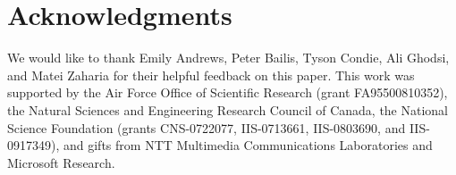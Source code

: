 \section*{Acknowledgments}
We would like to thank Emily Andrews, Peter Bailis, Tyson Condie, Ali Ghodsi,
and Matei Zaharia for their helpful feedback on this paper.  This work was
supported by the Air Force Office of Scientific Research (grant FA95500810352),
the Natural Sciences and Engineering Research Council of Canada, the National
Science Foundation (grants CNS-0722077, IIS-0713661, IIS-0803690, and
IIS-0917349), and gifts from NTT Multimedia Communications Laboratories and
Microsoft Research.
